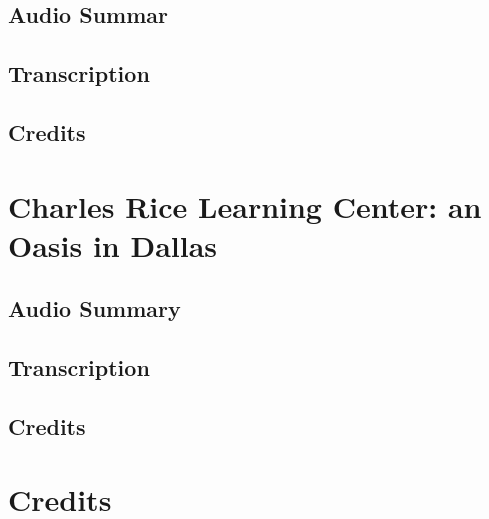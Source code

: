 \subsection{Audio Summar}

\subsection{Transcription}

\subsection{Credits}

\section{Charles Rice Learning Center: an Oasis in Dallas}

\subsection{Audio Summary}

\subsection{Transcription}

\subsection{Credits}

\section{Credits}